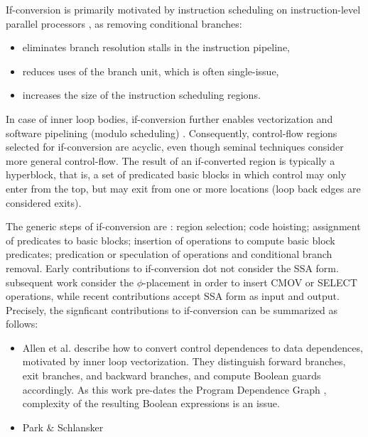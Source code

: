 If-conversion is primarily motivated by instruction scheduling on
instruction-level parallel processors \cite{Mahlke:1995:ISCA}, as removing
conditional branches: \begin{itemize} \item eliminates branch resolution stalls
in the instruction pipeline, \item reduces uses of the branch unit, which is
often single-issue, \item increases the size of the instruction scheduling
regions.  \end{itemize} In case of inner loop bodies, if-conversion further
enables vectorization \cite{Allen:1993:POPL} and software pipelining (modulo
scheduling) \cite{Park:1991:HPL58}. Consequently, control-flow regions selected
for if-conversion are acyclic, even though seminal techniques
\cite{Allen:1993:POPL, Park:1991:HPL58} consider more general control-flow.
The result of an if-converted region is typically a hyperblock, that is, a set
of predicated basic blocks in which control may only enter from the top, but may
exit from one or more locations \cite{Mahlke:1992:MICRO} (loop back edges are
considered exits).
\medskip

The generic steps of if-conversion are \cite{Fang:1996:LCPC}: region selection;
code hoisting; assignment of predicates to basic blocks; insertion of
operations to compute basic block predicates; predication or speculation of
operations and conditional branch removal. Early contributions to if-conversion
dot not consider the SSA form. subsequent work consider the $\phi$-placement in
order to insert CMOV or SELECT operations, while recent contributions accept SSA
form as input and output. Precisely, the signficant contributions to
if-conversion can be summarized as follows: \begin{itemize}

\item Allen et al. \cite{Allen:1983:POPL} describe how to convert control
dependences to data dependences, motivated by inner loop vectorization. They
distinguish forward branches, exit branches, and backward branches, and compute
Boolean guards accordingly. As this work pre-dates the Program Dependence Graph
\cite{Ferreante:1987:TOPLAS}, complexity of the resulting Boolean expressions is
an issue.

\item Park \& Schlansker 

\end{itemize}

